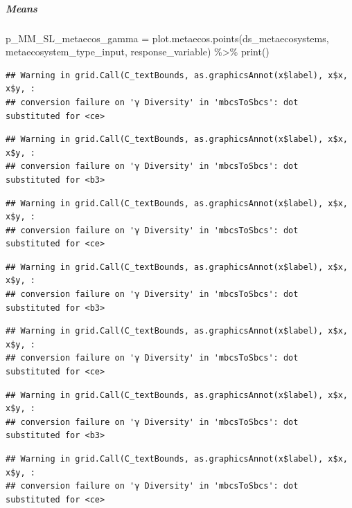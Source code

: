 \documentclass[
]{article}
\newenvironment{Shaded}{\begin{snugshade}}{\end{snugshade}}
\newcommand{\FunctionTok}[1]{\textcolor[rgb]{0.00,0.00,0.00}{#1}}
\newcommand{\NormalTok}[1]{#1}
\newcommand{\OtherTok}[1]{\textcolor[rgb]{0.56,0.35,0.01}{#1}}
\newcommand{\SpecialCharTok}[1]{\textcolor[rgb]{0.00,0.00,0.00}{#1}}
\begin{document}
\hypertarget{means-7}{%
\subparagraph{Means}\label{means-7}}

\begin{Shaded}
\begin{Highlighting}[]
\NormalTok{p\_MM\_SL\_metaecos\_gamma }\OtherTok{=} \FunctionTok{plot.metaecos.points}\NormalTok{(ds\_metaecosystems, metaecosystem\_type\_input,}
\NormalTok{                     response\_variable) }\SpecialCharTok{\%\textgreater{}\%}
  \FunctionTok{print}\NormalTok{()}
\end{Highlighting}
\end{Shaded}

\begin{verbatim}
## Warning in grid.Call(C_textBounds, as.graphicsAnnot(x$label), x$x, x$y, :
## conversion failure on 'γ Diversity' in 'mbcsToSbcs': dot substituted for <ce>
\end{verbatim}

\begin{verbatim}
## Warning in grid.Call(C_textBounds, as.graphicsAnnot(x$label), x$x, x$y, :
## conversion failure on 'γ Diversity' in 'mbcsToSbcs': dot substituted for <b3>
\end{verbatim}

\begin{verbatim}
## Warning in grid.Call(C_textBounds, as.graphicsAnnot(x$label), x$x, x$y, :
## conversion failure on 'γ Diversity' in 'mbcsToSbcs': dot substituted for <ce>
\end{verbatim}

\begin{verbatim}
## Warning in grid.Call(C_textBounds, as.graphicsAnnot(x$label), x$x, x$y, :
## conversion failure on 'γ Diversity' in 'mbcsToSbcs': dot substituted for <b3>
\end{verbatim}

\begin{verbatim}
## Warning in grid.Call(C_textBounds, as.graphicsAnnot(x$label), x$x, x$y, :
## conversion failure on 'γ Diversity' in 'mbcsToSbcs': dot substituted for <ce>
\end{verbatim}

\begin{verbatim}
## Warning in grid.Call(C_textBounds, as.graphicsAnnot(x$label), x$x, x$y, :
## conversion failure on 'γ Diversity' in 'mbcsToSbcs': dot substituted for <b3>
\end{verbatim}

\begin{verbatim}
## Warning in grid.Call(C_textBounds, as.graphicsAnnot(x$label), x$x, x$y, :
## conversion failure on 'γ Diversity' in 'mbcsToSbcs': dot substituted for <ce>
\end{verbatim}
\end{document}
